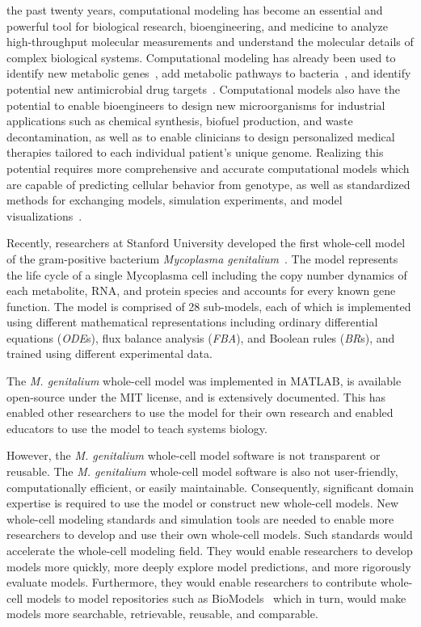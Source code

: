 \documentclass[journal,transmag]{IEEEtran}
\begin{document}
 the past twenty years, computational modeling has become an essential and powerful tool for biological research, bioengineering, and medicine to analyze high-throughput molecular measurements and understand the molecular details of complex biological systems. 
Computational modeling has already been used to identify new metabolic genes~\cite{Reed2006}, add metabolic pathways to bacteria~\cite{Lee2009}, and identify potential new antimicrobial drug targets~\cite{Lee2012}. 
Computational models also have the potential to enable bioengineers to design new microorganisms for industrial applications such as chemical synthesis, biofuel production, and waste decontamination, as well as to enable clinicians to design personalized medical therapies tailored to each individual patient's unique genome. 
Realizing this potential requires more comprehensive and accurate computational models which are capable of predicting cellular behavior from genotype, as well as standardized methods for exchanging models, simulation experiments, and model visualizations~\cite{Macklin2014,Karr2015,hucka2015promoting,Klipp07}.

Recently, researchers at Stanford University developed the first whole-cell model of the gram-positive bacterium \textit{Mycoplasma genitalium}~\cite{Karr2012}. 
The model represents the life cycle of a single Mycoplasma cell including the copy number dynamics of each metabolite, RNA, and protein species and accounts for every known gene function. 
The model is comprised of 28 sub-models, each of which is implemented using different mathematical representations including ordinary differential equations (\emph{ODE}s), flux balance analysis (\emph{FBA}), and Boolean rules (\emph{BR}s), and trained using different experimental data. 

The \textit{M. genitalium} whole-cell model was implemented in MATLAB, is available open-source under the MIT license, and is extensively documented. 
This has enabled other researchers to use the model for their own research and enabled educators to use the model to teach systems biology. 

However, the \textit{M. genitalium} whole-cell model software is not transparent or reusable. The \textit{M. genitalium} whole-cell model software is also not user-friendly, computationally efficient, or easily maintainable. Consequently, significant domain expertise is required to use the model or construct new whole-cell models.
New whole-cell modeling standards and simulation tools are needed to enable more researchers to develop and use their own whole-cell models. 
Such standards would accelerate the whole-cell modeling field. They would enable researchers to develop models more quickly, more deeply explore model predictions, and more rigorously evaluate models. Furthermore, they would enable researchers to contribute whole-cell models to model repositories such as BioModels~\cite{li2010biomodels} which in turn, would make models more searchable, retrievable, reusable, and comparable.
\end{document}
